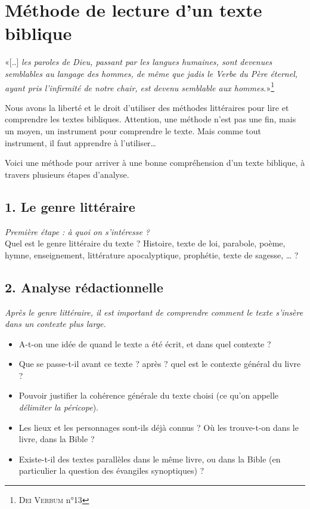 \section*{Méthode de lecture d'un texte biblique}
«[..] \textit{les paroles de Dieu, passant par les langues humaines, sont devenues semblables au langage des hommes, de même que jadis le Verbe du Père éternel, ayant pris l’infirmité de notre chair, est devenu semblable aux hommes.}»\footnote{\textsc{Dei Verbum} n°13}\par
Nous avons la liberté et le droit d’utiliser des méthodes littéraires pour lire et comprendre les textes bibliques. Attention, une méthode n’est pas une fin, mais un moyen, un instrument pour comprendre le texte. Mais comme tout instrument, il faut apprendre à l’utiliser… \par
Voici une méthode pour arriver à une bonne compréhension d'un texte biblique, à travers plusieurs étapes d'analyse.

\subsection*{1. Le genre littéraire}
\textit{Première étape : à quoi on s’intéresse ?}\\
Quel est le genre littéraire du texte ? Histoire, texte de loi, parabole, poème, hymne, enseignement, littérature apocalyptique, prophétie, texte de sagesse, … ?
\subsection*{2. Analyse rédactionnelle}
\textit{Après le genre littéraire, il est important de comprendre comment le texte s’insère dans un contexte plus large.}
\begin{itemize}[label=]
    \item A-t-on une idée de quand le texte a été écrit, et dans quel contexte ?
    \item Que se passe-t-il avant ce texte ? après ? quel est le contexte général du livre ?
    \item Pouvoir justifier la cohérence générale du texte choisi (ce qu'on appelle \textit{délimiter la péricope}).
    \item Les lieux et les personnages sont-ils déjà connus ? Où les trouve-t-on dans le livre, dans la Bible ?
    \item Existe-t-il des textes parallèles dans le même livre, ou dans la Bible (en particulier la question des évangiles synoptiques) ?
\end{itemize}
